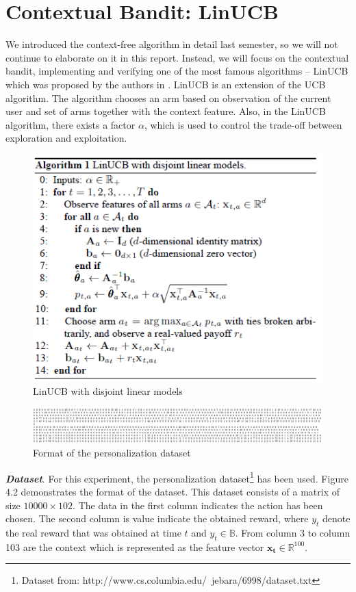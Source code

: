 \section{Contextual Bandit: LinUCB}
We introduced the context-free algorithm in detail last semester, so we will not continue to elaborate on it in this report. Instead, we will focus on the contextual bandit, implementing and verifying one of the most famous algorithms – LinUCB which was proposed by the authors in \cite{context}. LinUCB is an extension of the UCB algorithm. The algorithm chooses an arm based on observation of the current user and set of arms together with the context feature.  Also, in the LinUCB algorithm, there exists a factor $\alpha$, which is used to control the trade-off between exploration and exploitation.

\begin{figure}[htbp]
\centering
\includegraphics[scale=0.8]{figure/alg1.png}
\caption{LinUCB with disjoint linear models \cite{context}}
\end{figure}

\begin{figure}[htbp]
    \centering
    \includegraphics[scale =0.4]{figure/data1.png}
    \caption{Format of the personalization dataset}
    \end{figure}
\textbf{\textit{Dataset}}. For this experiment, the personalization dataset\footnote[3]{Dataset from: http://www.cs.columbia.edu/~jebara/6998/dataset.txt} has been used. Figure 4.2 demonstrates the format of the dataset. This dataset consists of a matrix of size $10000 \times 102$. The data in the first column indicates the action has been chosen. The second column is value indicate the obtained reward, where $y_{t}$ denote the real reward that was obtained at time $t$ and $y_{t}\in \mathbb{B}$. From column 3 to column 103 are the context which is represented as the feature vector $\mathbf{x_{t}}\in\mathbb{R}^{100}$.

